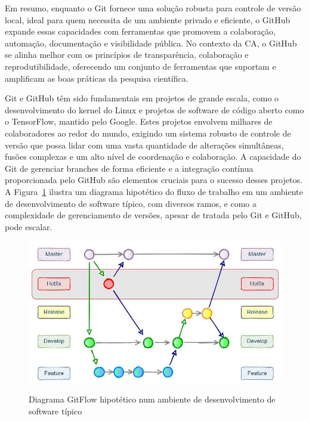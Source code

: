 \documentclass[
  a4paper,
]{article}
\begin{document}
Em resumo, enquanto o Git fornece uma solução robusta para controle de
versão local, ideal para quem necessita de um ambiente privado e
eficiente, o GitHub expande essas capacidades com ferramentas que
promovem a colaboração, automação, documentação e visibilidade pública.
No contexto da CA, o GitHub se alinha melhor com os princípios de
transparência, colaboração e reprodutibilidade, oferecendo um conjunto
de ferramentas que suportam e amplificam as boas práticas da pesquisa
científica.

Git e GitHub têm sido fundamentais em projetos de grande escala, como o
desenvolvimento do kernel do Linux e projetos de software de código
aberto como o TensorFlow, mantido pelo Google. Estes projetos envolvem
milhares de colaboradores ao redor do mundo, exigindo um sistema robusto
de controle de versão que possa lidar com uma vasta quantidade de
alterações simultâneas, fusões complexas e um alto nível de coordenação
e colaboração. A capacidade do Git de gerenciar branches de forma
eficiente e a integração contínua proporcionada pelo GitHub são
elementos cruciais para o sucesso desses projetos. A
Figura~\ref{fig-gitflow} ilustra um diagrama hipotético do fluxo de
trabalho em um ambiente de desenvolvimento de software típico, com
diversos ramos, e como a complexidade de gerenciamento de versões,
apesar de tratada pelo Git e GitHub, pode escalar.

\begin{figure}

\href{https://www.theserverside.com/blog/Coffee-Talk-Java-News-Stories-and-Opinions/Gitflow-release-branch-process-start-finish}{\includegraphics{img/gitflow.jpg}}

\caption{\label{fig-gitflow}Diagrama GitFlow hipotético num ambiente de
desenvolvimento de software típico}

\end{figure}%
\end{document}
